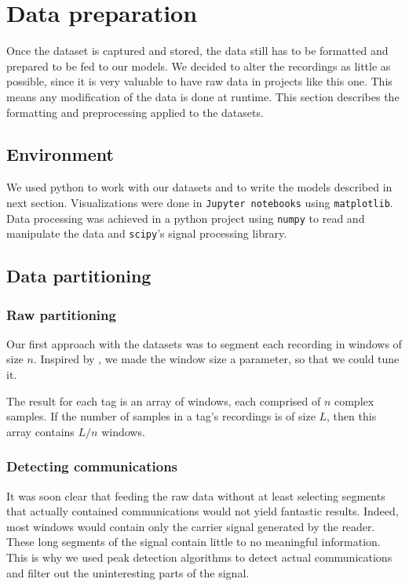 \section{Data preparation}

Once the dataset is captured and stored, the data still has to be formatted and prepared to be fed to our models. We decided to alter the recordings as little as possible, since it is very valuable to have raw data in projects like this one. This means any modification of the data is done at runtime. This section describes the formatting and preprocessing applied to the datasets.

\subsection{Environment}

We used python to work with our datasets and to write the models described in next section. Visualizations were done in \texttt{Jupyter notebooks} using \texttt{matplotlib}. Data processing was achieved in a python project using \texttt{numpy} to read and manipulate the data and \texttt{scipy}'s signal processing library.

\subsection{Data partitioning}

\subsubsection{Raw partitioning}

Our first approach with the datasets was to segment each recording in windows of size $n$. Inspired by \textcite{youssef_machine_2017}, we made the window size a parameter, so that we could tune it.

The result for each tag is an array of windows, each comprised of $n$ complex samples. If the number of samples in a tag's recordings is of size $L$, then this array contains $L/n$ windows.

\subsubsection{Detecting communications}

It was soon clear that feeding the raw data without at least selecting segments that actually contained communications would not yield fantastic results. Indeed, most windows would contain only the carrier signal generated by the reader. These long segments of the signal contain little to no meaningful information. This is why we used peak detection algorithms to detect actual communications and filter out the uninteresting parts of the signal.

